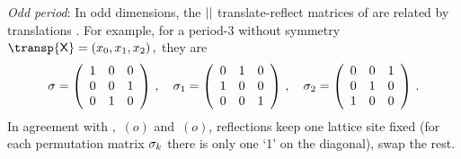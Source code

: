 \emph{Odd period}:
In odd dimensions, the ${||}$ translate-reflect matrices of \Dn{\cl{}} are
related by translations .
For example, for a period-3 {\lattstate}
without symmetry
\(
\transp{\Xx} = (\ssp_0,\ssp_1,\ssp_2)
\,,
\)
they are
\[
\sigma=
\left(
\begin{array}{ccc}
 1 & 0 & 0 \\
 0 & 0 & 1 \\
 0 & 1 & 0
\end{array}
\right)
    \,,\quad
{\ensuremath{\sigma}_1}=
\left(
\begin{array}{ccc}
 0 & 1 & 0 \\
 1 & 0 & 0 \\
 0 & 0 & 1
\end{array}
\right)
    \,,\quad
\sigma_2=
\left(
\begin{array}{ccc}
 0 & 0 & 1 \\
 0 & 1 & 0 \\
 1 & 0 & 0
\end{array}
\right)
\,.
\]
In agreement with , \,$(o)$ and
\,$(o)$, reflections keep one lattice site fixed
(for each permutation matrix $\sigma_k$ there is only one `1' on the
diagonal), swap the rest.

